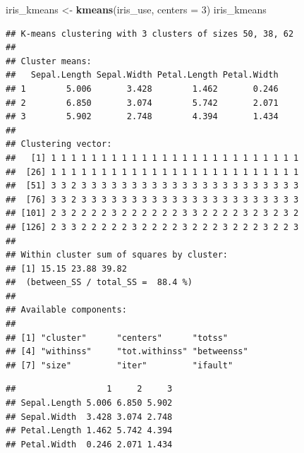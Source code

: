 \documentclass[
]{book}
\newenvironment{Shaded}{\begin{snugshade}}{\end{snugshade}}
\newcommand{\AttributeTok}[1]{\textcolor[rgb]{0.13,0.29,0.53}{#1}}
\newcommand{\CommentTok}[1]{\textcolor[rgb]{0.56,0.35,0.01}{\textit{#1}}}
\newcommand{\ControlFlowTok}[1]{\textcolor[rgb]{0.13,0.29,0.53}{\textbf{#1}}}
\newcommand{\DecValTok}[1]{\textcolor[rgb]{0.00,0.00,0.81}{#1}}
\newcommand{\FunctionTok}[1]{\textcolor[rgb]{0.13,0.29,0.53}{\textbf{#1}}}
\newcommand{\NormalTok}[1]{#1}
\newcommand{\OtherTok}[1]{\textcolor[rgb]{0.56,0.35,0.01}{#1}}
\newcommand{\SpecialCharTok}[1]{\textcolor[rgb]{0.81,0.36,0.00}{\textbf{#1}}}
\theoremstyle{definition}
\theoremstyle{definition}
\theoremstyle{definition}
\theoremstyle{definition}
\theoremstyle{remark}
\begin{document}
\begin{Shaded}
\begin{Highlighting}[]
\NormalTok{iris\_kmeans }\OtherTok{\textless{}{-}} \FunctionTok{kmeans}\NormalTok{(iris\_use, }\AttributeTok{centers =} \DecValTok{3}\NormalTok{)}
\NormalTok{iris\_kmeans}
\end{Highlighting}
\end{Shaded}

\begin{verbatim}
## K-means clustering with 3 clusters of sizes 50, 38, 62
## 
## Cluster means:
##   Sepal.Length Sepal.Width Petal.Length Petal.Width
## 1        5.006       3.428        1.462       0.246
## 2        6.850       3.074        5.742       2.071
## 3        5.902       2.748        4.394       1.434
## 
## Clustering vector:
##   [1] 1 1 1 1 1 1 1 1 1 1 1 1 1 1 1 1 1 1 1 1 1 1 1 1 1
##  [26] 1 1 1 1 1 1 1 1 1 1 1 1 1 1 1 1 1 1 1 1 1 1 1 1 1
##  [51] 3 3 2 3 3 3 3 3 3 3 3 3 3 3 3 3 3 3 3 3 3 3 3 3 3
##  [76] 3 3 2 3 3 3 3 3 3 3 3 3 3 3 3 3 3 3 3 3 3 3 3 3 3
## [101] 2 3 2 2 2 2 3 2 2 2 2 2 2 3 3 2 2 2 2 3 2 3 2 3 2
## [126] 2 3 3 2 2 2 2 2 3 2 2 2 2 3 2 2 2 3 2 2 2 3 2 2 3
## 
## Within cluster sum of squares by cluster:
## [1] 15.15 23.88 39.82
##  (between_SS / total_SS =  88.4 %)
## 
## Available components:
## 
## [1] "cluster"      "centers"      "totss"       
## [4] "withinss"     "tot.withinss" "betweenss"   
## [7] "size"         "iter"         "ifault"
\end{verbatim}

\begin{Shaded}
\end{Shaded}

\begin{verbatim}
##                  1     2     3
## Sepal.Length 5.006 6.850 5.902
## Sepal.Width  3.428 3.074 2.748
## Petal.Length 1.462 5.742 4.394
## Petal.Width  0.246 2.071 1.434
\end{verbatim}
\end{document}
